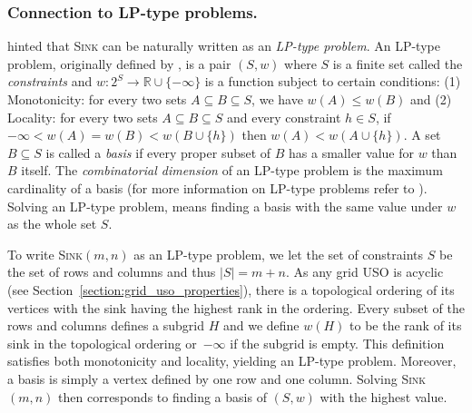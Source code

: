 \documentclass[runningheads,a4paper]{llncs}
\newcommand{\sink}{\textsc{Sink}\xspace}
\newcommand{\sinkmn}{\textsc{Sink}$(m,n)$\xspace}
\begin{document}
\vspace{-.2in}\subsubsection{Connection to LP-type problems.} 
\citet{grid08} hinted that \sink
can be naturally written as an \emph{LP-type problem}. An LP-type problem, originally defined by \citet{SharirW92}, is a pair $(S,w)$ where $S$ is a finite set called the \emph{constraints} and
$w:2^S \rightarrow \mathbb{R} \cup \{-\infty\}$ is a function subject to certain conditions: 
(1) Monotonicity: for every two sets $A \subseteq B \subseteq S$, we have $w(A) \leq w(B) $ and
(2) Locality: for every two sets $A \subseteq B \subseteq S$ and every constraint $h \in S$, if $-\infty < w(A) = w(B) < w(B\cup \{h\})$ then $w(A) < w(A \cup \{h\})$.
A set $B \subseteq S$ is called a \emph{basis} if every proper subset
of $B$ has a smaller value for $w$ than $B$ itself. The \emph{combinatorial dimension} of an LP-type problem 
is the maximum cardinality of a basis
(for more information on LP-type problems refer to \cite{MatousekSW96}). Solving an LP-type problem, means finding a basis with the same value under $w$ as the whole set $S$.

To write \sinkmn as an LP-type problem, we let the set of constraints $S$ be the set of rows and columns and thus $|S| = m + n$. As any grid USO is acyclic (see Section~\ref{section:grid_uso_properties}), there is a topological ordering of its vertices with the sink having the highest rank in the ordering. 
Every subset of the rows and columns defines a subgrid $H$ and we define $w(H)$ to be the rank of its sink in the topological ordering or~$-\infty$ if the subgrid is empty.
This definition satisfies both monotonicity and locality, yielding an LP-type problem.
Moreover, a basis is simply a vertex defined by one row and one column.
Solving \sinkmn then corresponds to finding a basis of $(S,w)$ with the highest value. 
 
\end{document}
